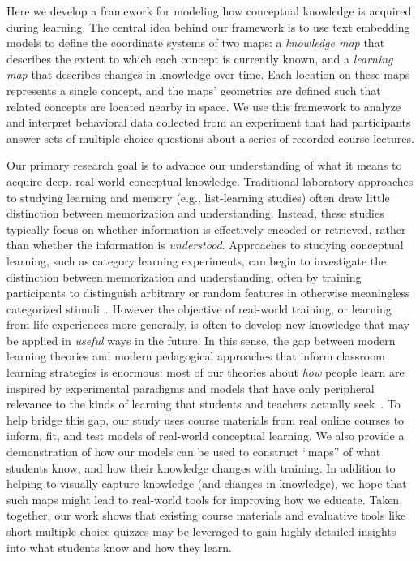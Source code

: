 \documentclass[10pt]{article}
\begin{document}
Here we develop a framework for modeling how conceptual knowledge is acquired
during learning. The central idea behind our framework is to use text embedding
models to define the coordinate systems of two maps: a \textit{knowledge
map} that describes the extent to which each concept is currently known, and
a \textit{learning map} that describes changes in knowledge over time. Each
location on these maps represents a single concept, and the maps' geometries
are defined such that related concepts are located nearby in space. We use this
framework to analyze and interpret behavioral data collected from an experiment
that had participants answer sets of multiple-choice questions about a series of
recorded course lectures.

Our primary research goal is to advance our understanding of what it means to
acquire deep, real-world conceptual knowledge. Traditional laboratory
approaches to studying learning and memory (e.g., list-learning studies) often
draw little distinction between memorization and understanding. Instead, these
studies typically focus on whether information is effectively encoded or
retrieved, rather than whether the information is \textit{understood}.
Approaches to studying conceptual learning, such as category learning
experiments, can begin to investigate the distinction between memorization and
understanding, often by training participants to distinguish arbitrary or
random features in otherwise meaningless categorized stimuli~\citep{ReilEtal82,
Este86a, Este86b, GlucEtal02, AshbMadd05, HulbNorm15}. However the objective of
real-world training, or learning from life experiences more generally, is often
to develop new knowledge that may be applied in \textit{useful} ways in the
future. In this sense, the gap between modern learning theories and modern
pedagogical approaches that inform classroom learning strategies is enormous:
most of our theories about \textit{how} people learn are inspired by
experimental paradigms and models that have only peripheral relevance to the
kinds of learning that students and teachers actually seek~\citep{Macl05,
HallGree08}. To help bridge this gap, our study uses course materials from real
online courses to inform, fit, and test models of real-world conceptual
learning. We also provide a demonstration of how our models can be used to
construct ``maps'' of what students know, and how their knowledge changes with
training. In addition to helping to visually capture knowledge (and changes in
knowledge), we hope that such maps might lead to real-world tools for improving
how we educate. Taken together, our work shows that existing course materials
and evaluative tools like short multiple-choice quizzes may be leveraged to
gain highly detailed insights into what students know and how they learn.
\end{document}
